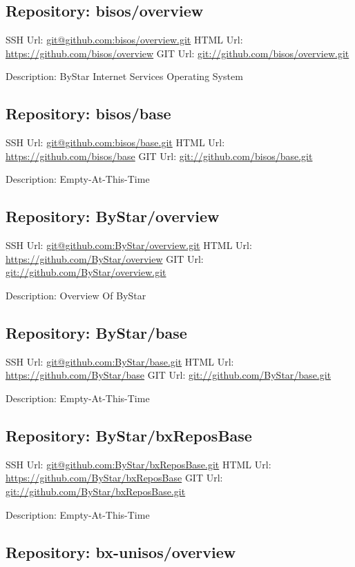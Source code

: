 \subsection{Repository: bisos/overview}

SSH Url:  \url{git@github.com:bisos/overview.git}
HTML Url: \url{https://github.com/bisos/overview}
GIT Url:  \url{git://github.com/bisos/overview.git}

Description: ByStar Internet Services Operating System

\subsection{Repository: bisos/base}

SSH Url:  \url{git@github.com:bisos/base.git}
HTML Url: \url{https://github.com/bisos/base}
GIT Url:  \url{git://github.com/bisos/base.git}

Description: Empty-At-This-Time

\subsection{Repository: ByStar/overview}

SSH Url:  \url{git@github.com:ByStar/overview.git}
HTML Url: \url{https://github.com/ByStar/overview}
GIT Url:  \url{git://github.com/ByStar/overview.git}

Description: Overview Of ByStar

\subsection{Repository: ByStar/base}

SSH Url:  \url{git@github.com:ByStar/base.git}
HTML Url: \url{https://github.com/ByStar/base}
GIT Url:  \url{git://github.com/ByStar/base.git}

Description: Empty-At-This-Time

\subsection{Repository: ByStar/bxReposBase}

SSH Url:  \url{git@github.com:ByStar/bxReposBase.git}
HTML Url: \url{https://github.com/ByStar/bxReposBase}
GIT Url:  \url{git://github.com/ByStar/bxReposBase.git}

Description: Empty-At-This-Time

\subsection{Repository: bx-unisos/overview}

